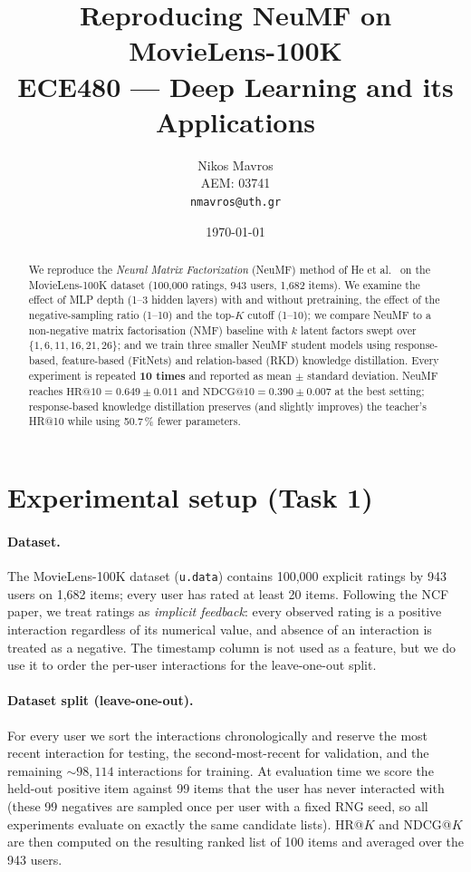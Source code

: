 \documentclass[11pt,a4paper]{article}
\title{\textbf{Reproducing NeuMF on MovieLens-100K} \\[4pt]
       \large ECE480 --- Deep Learning and its Applications}
\author{%
  Nikos Mavros \\
  AEM: 03741 \\
  \texttt{nmavros@uth.gr}
}
\date{\today}
\begin{document}
\maketitle

\begin{abstract}
We reproduce the \textit{Neural Matrix Factorization} (NeuMF) method
of He et al.~\cite{he2017ncf} on the MovieLens-100K dataset (100{,}000
ratings, 943 users, 1{,}682 items). We examine the effect of MLP depth
(1--3 hidden layers) with and without pretraining, the effect of the
negative-sampling ratio (1--10) and the top-$K$ cutoff (1--10); we compare
NeuMF to a non-negative matrix factorisation (NMF) baseline with $k$
latent factors swept over $\{1,6,11,16,21,26\}$; and we train three
smaller NeuMF student models using response-based, feature-based (FitNets)
and relation-based (RKD) knowledge distillation. Every experiment is
repeated \textbf{10 times} and reported as mean $\pm$ standard deviation.
NeuMF reaches $\mathrm{HR}@10 = 0.649 \pm 0.011$ and
$\mathrm{NDCG}@10 = 0.390 \pm 0.007$ at the best setting; response-based
knowledge distillation preserves (and slightly improves) the teacher's
HR@10 while using 50.7\,\% fewer parameters.
\end{abstract}

\section{Experimental setup (Task 1)}

\paragraph{Dataset.} The MovieLens-100K dataset (\texttt{u.data}) contains
100{,}000 explicit ratings by 943 users on 1{,}682 items; every user has
rated at least 20 items. Following the NCF paper, we treat ratings as
\emph{implicit feedback}: every observed rating is a positive interaction
regardless of its numerical value, and absence of an interaction is treated
as a negative. The timestamp column is not used as a feature, but we do use
it to order the per-user interactions for the leave-one-out split.

\paragraph{Dataset split (leave-one-out).} For every user we sort the
interactions chronologically and reserve the most recent interaction for
testing, the second-most-recent for validation, and the remaining
$\sim 98{,}114$ interactions for training. At evaluation time we score the
held-out positive item against 99 items that the user has never interacted
with (these 99 negatives are sampled once per user with a fixed RNG seed,
so all experiments evaluate on exactly the same candidate lists). HR@$K$
and NDCG@$K$ are then computed on the resulting ranked list of 100 items
and averaged over the 943 users.
\end{document}
